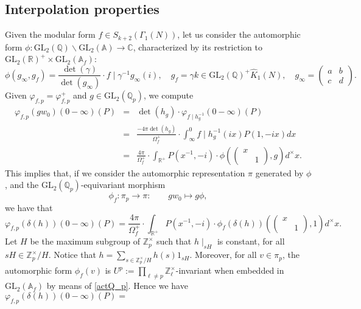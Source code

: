 \documentclass{amsart}
\newcommand{\GL}{{\mathrm{GL}}}
\newcommand{\Z}{{\mathbb Z}}
\newcommand{\A}{{\mathbb A}}
\newcommand{\Q}{{\mathbb Q}}
\newcommand{\C}{{\mathbb C}}
\newcommand{\R}{{\mathbb R}}
\begin{document}
\subsection{Interpolation properties}




Given the modular form $f\in S_{k+2}(\Gamma_1(N))$, let us consider the automorphic form $\phi:\GL_2(\Q)\backslash\GL_2(\A)\rightarrow\C$, characterized by its restriction to $\GL_2(\R)^+\times\GL_2(\A_f)$:
\[
\phi(g_\infty,g_f)=\frac{\det\left(\gamma\right)}{\det(g_\infty)}\cdot f\mid\gamma^{-1}g_\infty \left( i\right), \quad g_f=\gamma k\in \GL_2(\Q)^+\hat K_1(N), \quad g_\infty=\left(\begin{smallmatrix}a&b\\c&d\end{smallmatrix}\right).
\]
Given $\varphi_{f,p}=\varphi_{f,p}^+$ and $g\in\GL_2(\Q_p)$, we compute 
\begin{eqnarray*}
\varphi_{f,p}(gw_0)(0-\infty)(P)&=&\det(h_g)\cdot\varphi_{f\mid h_g^{-1}}(0-\infty)(P)\\
&=&\frac{-4\pi\det(h_g)}{\Omega_f^+}\cdot\int_\infty^0 f\mid h_g^{-1}(ix)P(1,-ix)dx\\
&=&\frac{4\pi }{\Omega_f^+}\cdot\int_{\R^+}P(x^{-1},-i)\cdot\phi\left(\left(\begin{smallmatrix}x&\\&1\end{smallmatrix}\right),g\right)d^{\times}x.
\end{eqnarray*}
This implies that, if we consider the automorphic representation $\pi$ generated by $\phi$, and the $\GL_2(\Q_p)$-equivariant morphism
\[
\phi_f:\pi_p\longrightarrow\pi:\qquad gw_0\longmapsto g\phi,
\]
we have that 
\[
\varphi_{f,p}(\delta(h))(0-\infty)(P)=\frac{4\pi }{\Omega_f^+}\cdot\int_{\R^+}P(x^{-1},-i)\cdot\phi_f\left(\delta(h)\right)\left(\left(\begin{smallmatrix}x&\\&1\end{smallmatrix}\right),1\right)d^{\times}x.
\]
Let $H$ be the maximum subgroup of $\Z_p^\times$ such that $h\mid_{sH}$ is constant, for all $sH\in\Z_p^\times/H$. Notice that $h=\sum_{s\in\Z_p^\times/H}h(s)1_{sH}$. Moreover, for all $v\in\pi_p$, the automorphic form $\phi_f(v)$ is $U^p:=\prod_{\ell\neq p}\Z_\ell^\times$-invariant when embedded in $\GL_2(\A_f)$  by means of \eqref{actQ_p}. Hence we have $\varphi_{f,p}(\delta(h))(0-\infty)(P)=$
\end{document}
